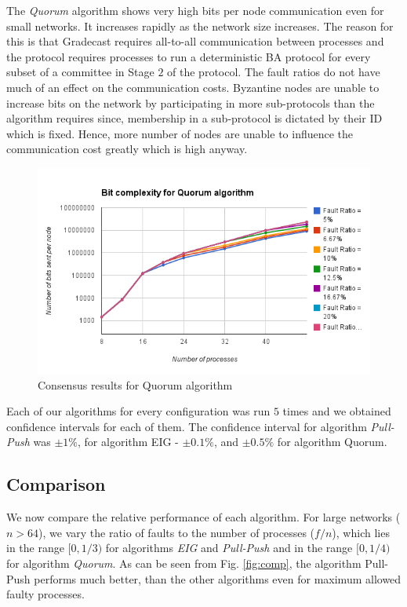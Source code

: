 The \textit{Quorum} algorithm shows very high bits per node communication even for small networks. It increases rapidly as the network size increases. The reason for this is that Gradecast requires all-to-all communication between processes and the protocol requires processes to run a deterministic BA protocol for every subset of a committee in Stage $2$ of the protocol. The fault ratios do not have much of an effect on the communication costs. Byzantine nodes are unable to increase bits on the network by participating in more sub-protocols than the algorithm requires since, membership in a sub-protocol is dictated by their ID which is fixed. Hence, more number of nodes are unable to influence the communication cost greatly which is high anyway.  
\begin{figure}[ht]
 \centering
\includegraphics[scale=0.4]{quorum}
\caption{Consensus results for Quorum algorithm}
 \label{fig:quorum}
\end{figure}

Each of our algorithms for every configuration was run $5$ times and we obtained confidence intervals for each of them. The confidence interval for algorithm \textit{Pull-Push} was $\pm 1\%$, for algorithm EIG - $\pm 0.1\%$, and $\pm 0.5\%$ for algorithm Quorum.

\subsection{Comparison}
We now compare the relative performance of each algorithm. For large networks ($n > 64$), we vary the ratio of faults to the number of processes ($f/n$), which lies in the range $[0, 1/3)$ for algorithms \textit{EIG} and \textit{Pull-Push} and in the range $[0, 1/4)$ for algorithm \textit{Quorum}.
As can be seen from Fig. \ref{fig:comp}, the algorithm Pull-Push performs much better, than the other algorithms even for maximum allowed faulty processes.

